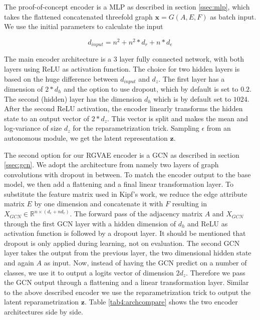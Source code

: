 The proof-of-concept encoder is a MLP as described in section \ref{ssec:mlp}, which takes the flattened concatenated threefold graph $\mathbf{x}=G(A,E,F)$ as batch input. We use the initial parameters to calculate the input

\begin{equation}
    d_{input} = n^2 + n^2*d_r + n*d_e
    \label{eq4:inputdim}
\end{equation}

The main encoder architecture is a 3 layer fully connected network, with both layers using ReLU as activation function. The choice for two hidden layers is based on the huge difference between $d_{input}$ and $d_z$. The first layer has a dimension of $2*d_h$ and the option to use dropout, which by default is set to $0.2$. The second (hidden) layer has the dimension $d_h$ which is by default set to $1024$. After the second ReLU activation, the encoder linearly transforms the hidden state to an output vector of $2 *d_z$. This vector is split and makes the mean and log-variance of size $d_z$ for the reparametrization trick. Sampling $\epsilon$ from an autonomous module, we get the latent representation $\mathbf{z}$.

The second option for our RGVAE encoder is a GCN as described in section \ref{ssec:gcn}. We adopt the architecture from \cite{kipf_semi-supervised_2017} namely two layers of graph convolutions with dropout in between. To match the encoder output to the base model, we then add a flattening and a final linear transformation layer. To substitute the feature matrix used in Kipf's work, we reduce the edge attribute matrix $E$ by one dimension and concatenate it with $F$ resulting in $X_{GCN} \in \mathbb{R}^{n \times (d_e+nd_r)}$. The forward pass of the adjacency matrix $A$ and $X_{GCN}$ through the first GCN layer with a hidden dimension of $d_h$ and ReLU as activation function is followed by a dropout layer. It should be mentioned that dropout is only applied during learning, not on evaluation. The second GCN layer takes the output from the previous layer, the two dimensional hidden state and again $A$ as input. Now, instead of having the GCN predict on a number of classes, we use it to output a logits vector of dimension $2d_z$. Therefore we pass the GCN output through a flattening and a linear transformation layer. Similar to the above described encoder we use the reparametrization trick to output the latent reparametrization $\mathbf{z}$. Table \ref{tab4:archcompare} shows the two encoder architectures side by side.


